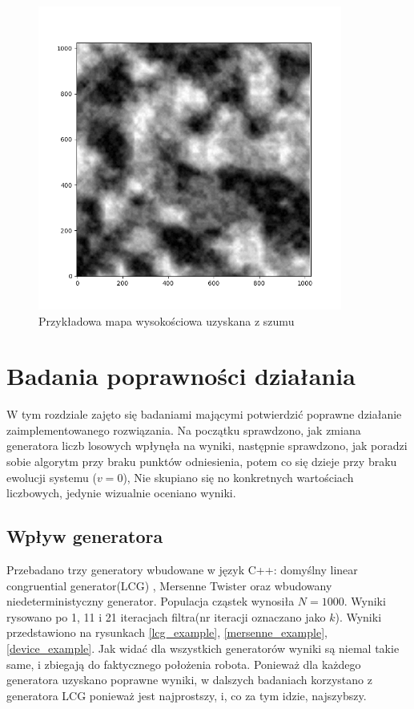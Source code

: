 \begin{figure}[H]
\begin{center}
	\includegraphics[width=10cm]{./przykladowa_mapa_szumu.png}
	\caption{Przykładowa mapa wysokościowa uzyskana z szumu}
	\label{przykladowa_mapa_szumu}
\end{center}
\end{figure}

\section{Badania poprawności działania}
W tym rozdziale zajęto się badaniami mającymi potwierdzić poprawne działanie zaimplementowanego rozwiązania. Na początku sprawdzono, jak zmiana generatora liczb losowych wpłynęła na wyniki, następnie sprawdzono, jak poradzi sobie algorytm przy braku punktów odniesienia, potem co się dzieje przy braku ewolucji systemu ($v=0$),
Nie skupiano się no konkretnych wartościach liczbowych, jedynie wizualnie oceniano wyniki.

\subsection{Wpływ generatora}
Przebadano trzy generatory wbudowane w język C++: domyślny linear congruential generator(LCG) \cite{lcg_wiki}, Mersenne Twister \cite{mersenne_wiki} oraz wbudowany niedeterministyczny generator. Populacja cząstek wynosiła $N=1000$. Wyniki rysowano po 1, 11 i 21 iteracjach filtra(nr iteracji oznaczano jako $k$). Wyniki przedstawiono na rysunkach \ref{lcg_example}, \ref{mersenne_example}, \ref{device_example}. Jak widać dla wszystkich generatorów wyniki są niemal takie same, i zbiegają do faktycznego położenia robota. Ponieważ dla każdego generatora uzyskano poprawne wyniki, w dalszych badaniach korzystano z generatora LCG ponieważ jest najprostszy, i, co za tym idzie, najszybszy.

